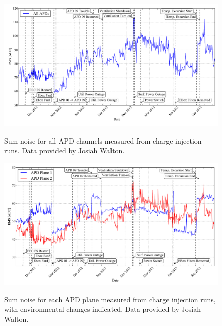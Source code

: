 \begin{figure}
\begin{center}
\includegraphics[keepaspectratio=true,width=\textwidth]{APDNoiseVsActions_sumall.pdf}
\end{center}
\renewcommand{\baselinestretch}{1}
\small\normalsize
\begin{quote}
\caption{Sum noise for all APD channels measured from charge injection runs.  Data provided by Josiah Walton.}
\label{fig:APDSumAllNoise_JosiahEnvironmental}
\end{quote}
\end{figure}
\renewcommand{\baselinestretch}{2}
\small\normalsize

\begin{figure}
\begin{center}
\includegraphics[keepaspectratio=true,width=\textwidth]{APDNoiseVsActions_planes.pdf}
\end{center}
\renewcommand{\baselinestretch}{1}
\small\normalsize
\begin{quote}
\caption{Sum noise for each APD plane measured from charge injection runs, with environmental changes indicated.  Data provided by Josiah Walton.}
\label{fig:APDSumPlaneNoise_JosiahEnvironmental}
\end{quote}
\end{figure}
\renewcommand{\baselinestretch}{2}
\small\normalsize

